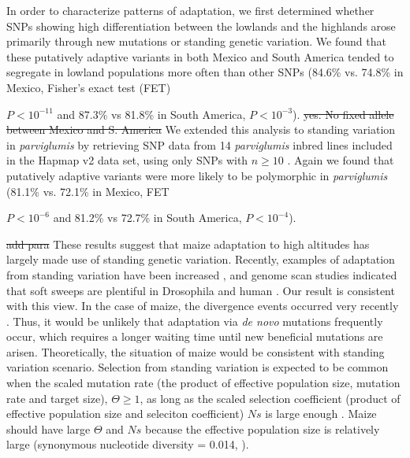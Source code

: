 In order to characterize patterns of adaptation, we first determined whether SNPs showing high differentiation between the lowlands and the highlands arose primarily through new mutations or standing genetic variation.  
We found that these putatively adaptive variants in both Mexico and South America tended to segregate in lowland populations more often than other SNPs (84.6\% vs. 74.8\% in Mexico, Fisher's exact test (FET) {$P < 10^{-11}$ and 87.3\% vs 81.8\% in South America,  $P< 10^{-3}$).  
\st{yes. No fixed allele between Mexico and S. America}
We extended this analysis to standing variation in \emph{parviglumis} by retrieving SNP data from 14 \emph{parviglumis} inbred lines included in the Hapmap v2 data set, using only SNPs with $n\geq10$ \cite[]{Chia_2012_22660545,Hufford_2012_22660546}.  
Again we found that putatively adaptive variants were more likely to be polymorphic in \emph{parviglumis} (81.1\% vs. 72.1\% in Mexico, FET {$P < 10^{-6}$ and 81.2\% vs 72.7\% in South America,  $P< 10^{-4}$).  

\st{add para}
These results suggest that maize adaptation to high altitudes has largely made use of standing genetic variation. 
Recently, examples of adaptation from standing variation have been increased \cite[Reviewed in ][]{Barrett_2008_18006185,Messer_2013_24075201}, and
genome scan studies indicated that soft sweeps are plentiful in Drosophila \cite[]{Garud_2013_ArXiv} and human \cite[]{Turchin_2012_22902787,Peter_2012_23071458}.
Our result is consistent with this view.
In the case of maize, the divergence events occurred very recently \cite[]{Piperno_2006_69,Perry_2006_16511492,Grobman_2012_22307642}.
Thus, it would be unlikely that adaptation via \emph{de novo} mutations frequently occur, which requires a longer waiting time until new beneficial mutations are arisen.
Theoretically, the situation of maize would be consistent with standing variation scenario.
Selection from standing variation is expected to be common when the scaled mutation rate (the product of effective population size, mutation rate and target size), $\Theta\geq1$, as long as the scaled selection coefficient (product of effective population size and seleciton coefficient) $Ns$ is large enough \cite[]{Hermisson_2005_15716498}.
Maize should have large $\Theta$ and $Ns$ because the effective population size is relatively large (synonymous nucleotide diversity = 0.014, \cite[\emph{e.g.,} ][]{Tenaillon_2004_15014173,Wright_2005_15919994,Ross-Ibarra_2009_19153259}).

}}
